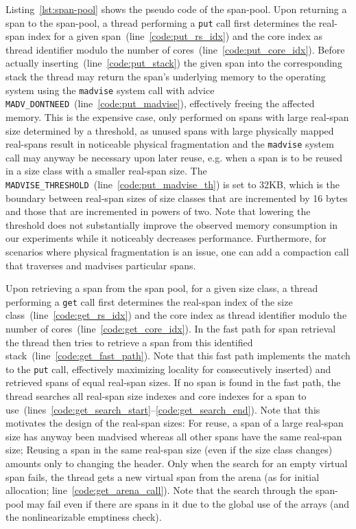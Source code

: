 \documentclass[10pt]{sigplanconf}
\newcommand{\lineRef}[1]{line~\ref{code:#1}}
\newcommand{\lineRangeRef}[2]{lines~\mbox{\ref{code:#1}--\ref{code:#2}}}
\newcommand{\impl}[1]{{\tt #1}\xspace}
\begin{document}
Listing~\ref{lst:span-pool} shows the pseudo code of the span-pool. Upon
returning a span to the span-pool, a thread performing a \texttt{put} call first
determines the real-span index for a given span~(\lineRef{put_rs_idx}) and the
core index as thread identifier modulo the number of
cores~(\lineRef{put_core_idx}). Before actually inserting~(\lineRef{put_stack})
the given span into the corresponding stack the thread may return the span's
underlying memory to the operating system using the {\tt  madvise} system call
with advice {\tt MADV\_DONTNEED}~(\lineRef{put_madvise}), effectively freeing
the affected memory. This is the expensive case, only performed on spans with
large real-span size determined by a threshold, as unused spans with large
physically mapped real-spans result in noticeable physical fragmentation and the
{\tt madvise} system call may anyway be necessary upon later reuse, e.g. when a
span is to be reused in a size class with a smaller real-span size. The 
\impl{MADVISE\_THRESHOLD}~(\lineRef{put_madvise_th}) is set to 32KB, which is
the boundary between real-span sizes of size  classes that are incremented by 16
bytes and those that are incremented in powers of two. Note that lowering the
threshold does not substantially improve the observed memory consumption in our
experiments while it noticeably decreases performance. Furthermore, for
scenarios where physical fragmentation is an issue, one can add a compaction
call that traverses and madvises particular spans.

Upon retrieving a span from the span pool, for a given size class, a  thread
performing a \texttt{get} call first determines the real-span index of the size
class~(\lineRef{get_rs_idx}) and the core index as thread identifier modulo
the number of cores~(\lineRef{get_core_idx}). In the fast path for span
retrieval the thread then tries to retrieve a span from this identified
stack~(\lineRef{get_fast_path}). Note that this fast path implements the
match to the \texttt{put} call, effectively maximizing locality for consecutively
inserted) and retrieved spans of equal real-span sizes. If no span is
found in the fast path, the thread searches all real-span size indexes and core
indexes for a span to
use~(\lineRangeRef{get_search_start}{get_search_end}). Note that this
motivates the design of the real-span sizes: For reuse, a span of a large
real-span size has anyway been madvised whereas all other spans have the same
real-span size; Reusing a span in the same real-span size (even if the size
class changes) amounts only to changing the header. Only when the search for an
empty virtual span  fails, the thread gets a new virtual span from the arena (as
for initial allocation; \lineRef{get_arena_call}). Note that the search
through the span-pool may fail even if there are spans in it due to the global
use of the arrays (and the nonlinearizable emptiness check).
\end{document}
